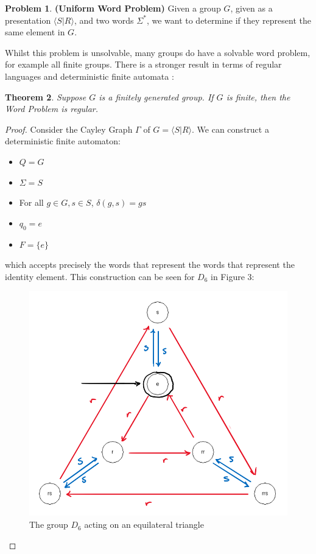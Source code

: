 \documentclass[10pt]{article}
\theoremstyle{plain}
\newtheorem{theorem}{Theorem}[section]
\theoremstyle{definition}
\theoremstyle{definition}
\theoremstyle{definition}
\newtheorem{problem}[theorem]{Problem}
\begin{document}
\begin{multicols}{2}
\begin{problem}
	\textbf{(Uniform Word Problem)} Given a group $G$, given as a presentation $\langle S | R \rangle $, and two words $\Sigma^*$, we want to determine if they represent the same element in $G$.
\end{problem}

Whilst this problem is unsolvable, many groups do have a solvable word problem, for example all finite groups. There is a stronger result in terms of regular languages and deterministic finite automata \cite{RegularWords}:

\begin{theorem}
	Suppose $G$ is a finitely generated group. If $G$ is finite, then the Word Problem is regular.
\end{theorem}

\begin{proof}
	Consider the Cayley Graph $\Gamma$ of $G = \langle S | R \rangle$. We can construct a deterministic finite automaton:

	\begin{itemize}
		\setlength\itemsep{-0.3em}
		\item $Q = G$
		\item $\Sigma = S$
		\item For all $g \in G, s \in S$, $\delta(g, s) = gs$
		\item $q_0 = e$
		\item $F = \{ e \}$ 
	\end{itemize}	

	which accepts precisely the words that represent the words that represent the identity element. This construction can be seen for $D_6$ in Figure 3:

	\begin{figure}[H]
		\centering
		\includegraphics[scale = 0.3]{DFA}
		\caption{The group $D_6$ acting on an equilateral triangle}
	\end{figure}
\end{proof}


\end{multicols}
\end{document}

